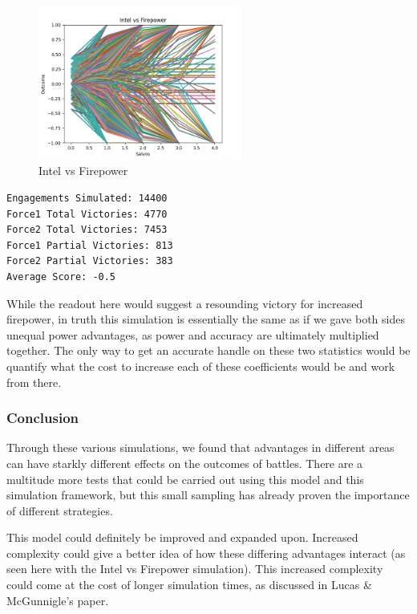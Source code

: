 \begin{figure}
\hypertarget{fig:refname}{%
\centering
\includegraphics[width=0.6\textwidth,height=\textheight]{figures/IntelVFire.png}
\caption{Intel vs Firepower}\label{fig:refname}
}
\end{figure}

\begin{verbatim}
Engagements Simulated: 14400
Force1 Total Victories: 4770
Force2 Total Victories: 7453
Force1 Partial Victories: 813
Force2 Partial Victories: 383
Average Score: -0.5
\end{verbatim}

While the readout here would suggest a resounding victory for increased
firepower, in truth this simulation is essentially the same as if we
gave both sides unequal power advantages, as power and accuracy are
ultimately multiplied together. The only way to get an accurate handle
on these two statistics would be quantify what the cost to increase each
of these coefficients would be and work from there.

\hypertarget{conclusion}{%
\subsubsection{Conclusion}\label{conclusion}}

Through these various simulations, we found that advantages in different
areas can have starkly different effects on the outcomes of battles.
There are a multitude more tests that could be carried out using this
model and this simulation framework, but this small sampling has already
proven the importance of different strategies.

This model could definitely be improved and expanded upon. Increased
complexity could give a better idea of how these differing advantages
interact (as seen here with the Intel vs Firepower simulation). This
increased complexity could come at the cost of longer simulation times,
as discussed in Lucas \& McGunnigle's paper.

